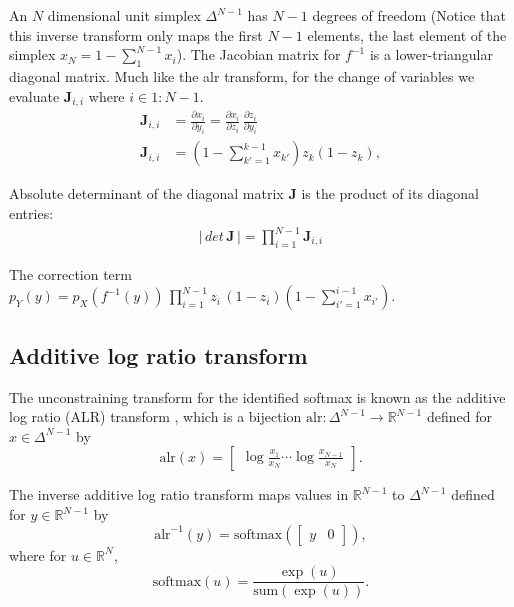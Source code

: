 \documentclass[11pt]{article}
\newcommand{\abs}[1]{\left| #1 \right|}
\begin{document}
An $N$ dimensional unit simplex $\Delta^{N-1}$ has $N-1$ degrees of freedom (Notice that this inverse transform only maps the first $N-1$ elements, the last element of the simplex $x_{N} = 1 - \sum_1^{N-1}{x_i}$). The Jacobian matrix for $f^{-1}$ is a lower-triangular diagonal matrix. Much like the alr transform, for the change of variables we evaluate $\mathbf{J}_{i, i}$ where $i \in 1:N-1$.
\begin{align*}
\mathbf{J}_{i, i} &= \frac{\partial x_i}{\partial y_i}
=
\frac{\partial x_i}{\partial z_i} \,
\frac{\partial z_i}{\partial y_i}\\
\mathbf{J}_{i, i} &= \left(
  1 - \sum_{k' = 1}^{k-1} x_{k'}
   \right) z_k (1 - z_k),
\end{align*}

Absolute determinant of the diagonal matrix $\mathbf{J}$ is the product of its diagonal entries:
\begin{align*}
	\abs{\, det \, \textbf{J} \,} = \prod_{i=1}^{N-1} \textbf{J}_{i,i}
\end{align*}

The correction term $p_Y(y) = p_X(f^{-1}(y))\,
\prod_{i=1}^{N-1}z_i\,(1 - z_i)\left(1 - \sum_{i'=1}^{i-1} x_{i'}\right).$
\subsection{Additive log ratio transform}

The unconstraining transform for the identified softmax is known as
the additive log ratio (ALR) transform
\cite{aitchison1982statistical}, which is a bijection
$\textrm{alr}:\Delta^{N-1} \rightarrow \mathbb{R}^{N-1}$ defined for
$x \in \Delta^{N-1}$ by
\[
  \textrm{alr}(x)
  = \begin{bmatrix}\displaystyle
    \log \frac{x_1}{x_N} \cdots \log \frac{x_{N-1}}{x_N}
  \end{bmatrix}.
\]

The inverse additive log ratio transform maps values in
$\mathbb{R}^{N-1}$ to $\Delta^{N-1}$ defined for $y \in
\mathbb{R}^{N-1}$ by
\[
  \textrm{alr}^{-1}(y)
  = \textrm{softmax}(\begin{bmatrix} y &  0 \end{bmatrix}),
\]
where for $u \in \mathbb{R}^N$,
\[
  \textrm{softmax}(u) = \frac{\exp(u)}{\textrm{sum}(\exp(u))}.
\]
\end{document}
